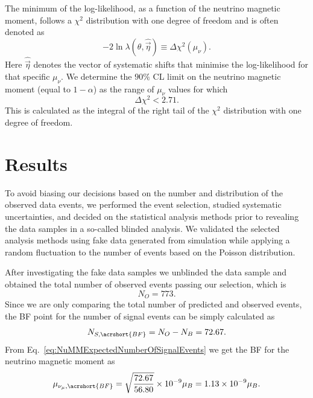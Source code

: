 The minimum of the log-likelihood, as a function of the neutrino magnetic moment, follows a $\chi^2$ distribution with one degree of freedom and is often denoted as
\begin{equation}
-2\ln\lambda\left(\theta,\hat{\overrightarrow{\eta}}\right)\equiv \Delta\chi^2\left(\mu_\nu\right).
\end{equation}
Here $\hat{\overrightarrow{\eta}}$ denotes the vector of systematic shifts that minimise the log-likelihood for that specific $\mu_\nu$. We determine the $90\%$ \gls{CL} limit on the neutrino magnetic moment (equal to $1-\alpha$) as the range of $\mu_\nu$ values for which 
\begin{equation}
\Delta\chi^2<2.71.
\end{equation}
This is calculated as the integral of the right tail of the $\chi^2$ distribution with one degree of freedom.

\section{Results}\label{sec:NuMMResults}
To avoid biasing our decisions based on the number and distribution of the observed data events, we performed the event selection, studied systematic uncertainties, and decided on the statistical analysis methods prior to revealing the data samples in a so-called blinded analysis. We validated the selected analysis methods using fake data generated from simulation while applying a random fluctuation to the number of events based on the Poisson distribution.

After investigating the fake data samples we unblinded the data sample and obtained the total number of observed events passing our selection, which is
\begin{equation}
N_O = 773.
\end{equation}
Since we are only comparing the total number of predicted and observed events, the \gls{BF} point for the number of signal events can be simply calculated as
\begin{equation}
N_{S,\acrshort{BF}}= N_O-N_B = 72.67.
\end{equation}
From Eq.~\ref{eq:NuMMExpectedNumberOfSignalEvents} we get the \gls{BF} for the neutrino magnetic moment as
\begin{equation}
\mu_{\nu_\mu,\acrshort{BF}} = \sqrt{\frac{72.67}{56.80}} \times 10^{-9}\mu_B = 1.13\times 10^{-9}\mu_B.
\end{equation}

